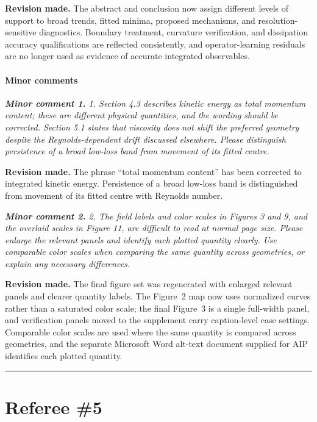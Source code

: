 \documentclass[11pt,a4paper]{article}
\newcommand{\qcomment}[1]{\textcolor{deepblue}{\itshape #1}}
\newcommand{\revwork}[1]{\textbf{\textcolor{revgreen}{#1}}}
\newcommand{\ruleline}{\begin{center}\rule{0.6\textwidth}{0.6pt}\end{center}}
\begin{document}
\noindent\revwork{Revision made.} The abstract and conclusion now assign different levels of support to broad trends, fitted minima, proposed mechanisms, and resolution-sensitive diagnostics. Boundary treatment, curvature verification, and dissipation accuracy qualifications are reflected consistently, and operator-learning residuals are no longer used as evidence of accurate integrated observables.

\medskip
\paragraph{Minor comments}

\medskip
\noindent\qcomment{\textbf{Minor comment 1.} 1. Section 4.3 describes kinetic energy as total momentum content; these are different physical quantities, and the wording should be corrected. Section 5.1 states that viscosity does not shift the preferred geometry despite the Reynolds-dependent drift discussed elsewhere. Please distinguish persistence of a broad low-loss band from movement of its fitted centre.}

\noindent\revwork{Revision made.} The phrase ``total momentum content'' has been corrected to integrated kinetic energy. Persistence of a broad low-loss band is distinguished from movement of its fitted centre with Reynolds number.

\medskip
\noindent\qcomment{\textbf{Minor comment 2.} 2. The field labels and color scales in Figures 3 and 9, and the overlaid scales in Figure 11, are difficult to read at normal page size. Please enlarge the relevant panels and identify each plotted quantity clearly. Use comparable color scales when comparing the same quantity across geometries, or explain any necessary differences.}

\noindent\revwork{Revision made.} The final figure set was regenerated with enlarged relevant panels and clearer quantity labels. The Figure~2 map now uses normalized curves rather than a saturated color scale; the final Figure~3 is a single full-width panel, and verification panels moved to the supplement carry caption-level case settings. Comparable color scales are used where the same quantity is compared across geometries, and the separate Microsoft Word alt-text document supplied for AIP identifies each plotted quantity.

\bigskip
\ruleline

\section*{Referee \#5}
\end{document}
